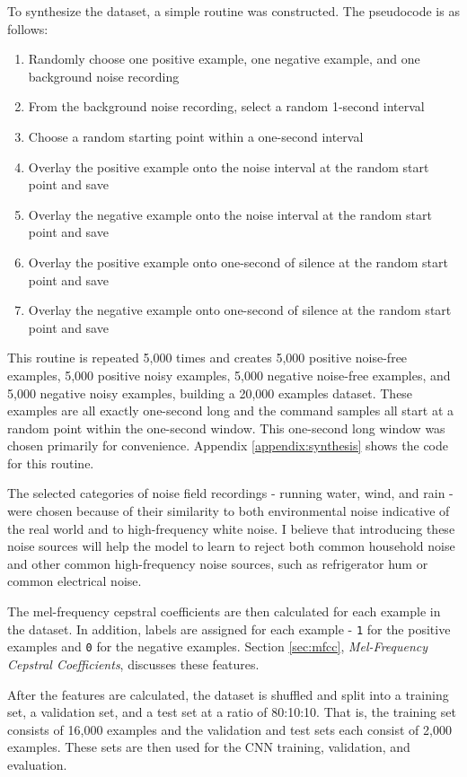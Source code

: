 \documentclass[conference]{IEEEtran}
\newcommand{\code}[1]{\texttt{#1}}
\begin{document}
To synthesize the dataset, a simple routine was constructed. The pseudocode is as follows: 
\begin{enumerate}
    \item Randomly choose one positive example, one negative example, and one background noise recording
    \item From the background noise recording, select a random 1-second interval
    \item Choose a random starting point within a one-second interval
    \item Overlay the positive example onto the noise interval at the random start point and save
    \item Overlay the negative example onto the noise interval at the random start point and save
    \item Overlay the positive example onto one-second of silence at the random start point and save
    \item Overlay the negative example onto one-second of silence at the random start point and save
\end{enumerate}
This routine is repeated 5,000 times and creates 5,000 positive noise-free examples,
5,000 positive noisy examples, 5,000 negative noise-free examples,
and 5,000 negative noisy examples, building a 20,000 examples dataset.
These examples are all exactly one-second long
and the command samples all start at a random point within the one-second window.
This one-second long window was chosen primarily for convenience.
Appendix \ref{appendix:synthesis} shows the code for this routine.

The selected categories of noise field recordings - running water, wind, and rain - 
were chosen because of their similarity to both 
environmental noise indicative of the real world and to high-frequency white noise.
I believe that introducing these noise sources will help the model to learn to reject
both common household noise and other common high-frequency noise sources,
such as refrigerator hum or common electrical noise.

The mel-frequency cepstral coefficients are then calculated for each example in the dataset.
In addition, labels are assigned for each example - 
\code{1} for the positive examples and \code{0} for the negative examples.
Section \ref{sec:mfcc}, \textit{Mel-Frequency Cepstral Coefficients},
discusses these features.

After the features are calculated, the dataset is shuffled 
and split into a training set, a validation set, and a test set at a ratio of 80:10:10. 
That is, the training set consists of 16,000 examples and the validation and test sets 
each consist of 2,000 examples.
These sets are then used for the CNN training, validation, and evaluation.
\end{document}
